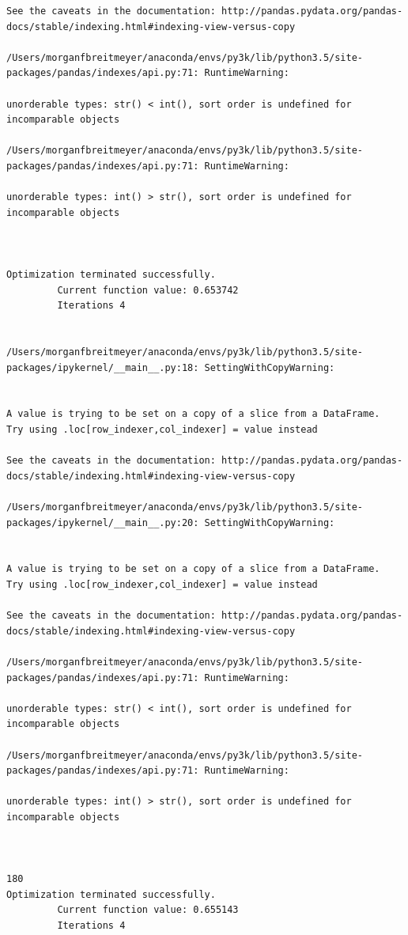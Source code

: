 \begin{lstlisting}
See the caveats in the documentation: http://pandas.pydata.org/pandas-docs/stable/indexing.html#indexing-view-versus-copy

/Users/morganfbreitmeyer/anaconda/envs/py3k/lib/python3.5/site-packages/pandas/indexes/api.py:71: RuntimeWarning:

unorderable types: str() < int(), sort order is undefined for incomparable objects

/Users/morganfbreitmeyer/anaconda/envs/py3k/lib/python3.5/site-packages/pandas/indexes/api.py:71: RuntimeWarning:

unorderable types: int() > str(), sort order is undefined for incomparable objects



Optimization terminated successfully.
         Current function value: 0.653742
         Iterations 4


/Users/morganfbreitmeyer/anaconda/envs/py3k/lib/python3.5/site-packages/ipykernel/__main__.py:18: SettingWithCopyWarning:


A value is trying to be set on a copy of a slice from a DataFrame.
Try using .loc[row_indexer,col_indexer] = value instead

See the caveats in the documentation: http://pandas.pydata.org/pandas-docs/stable/indexing.html#indexing-view-versus-copy

/Users/morganfbreitmeyer/anaconda/envs/py3k/lib/python3.5/site-packages/ipykernel/__main__.py:20: SettingWithCopyWarning:


A value is trying to be set on a copy of a slice from a DataFrame.
Try using .loc[row_indexer,col_indexer] = value instead

See the caveats in the documentation: http://pandas.pydata.org/pandas-docs/stable/indexing.html#indexing-view-versus-copy

/Users/morganfbreitmeyer/anaconda/envs/py3k/lib/python3.5/site-packages/pandas/indexes/api.py:71: RuntimeWarning:

unorderable types: str() < int(), sort order is undefined for incomparable objects

/Users/morganfbreitmeyer/anaconda/envs/py3k/lib/python3.5/site-packages/pandas/indexes/api.py:71: RuntimeWarning:

unorderable types: int() > str(), sort order is undefined for incomparable objects



180
Optimization terminated successfully.
         Current function value: 0.655143
         Iterations 4



\end{lstlisting}
